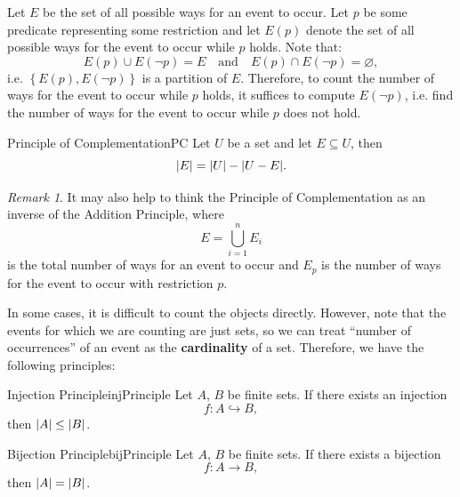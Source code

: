 \documentclass[math]{amznotes}
\theoremstyle{remark}
\newtheorem*{remark}{Remark}
\newcommand{\0}{\mathbf{0}}
\newcommand{\1}{\mathbf{1}}
\begin{document}
Let $E$ be the set of all possible ways for an event to occur. Let $p$ be some predicate representing some restriction and let $E(p)$ denote the set of all possible ways for the event to occur while $p$ holds. Note that:
\begin{displaymath}
    E(p) \cup E(\neg p) = E \quad \textrm{and} \quad E(p) \cap E(\neg p) = \varnothing,
\end{displaymath}
i.e. $\left\{E(p), E(\neg p)\right\}$ is a partition of $E$. Therefore, to count the number of ways for the event to occur while $p$ holds, it suffices to compute $E(\neg p)$, i.e. find the number of ways for the event to occur while $p$ does not hold.
\begin{thmbox}{Principle of Complementation}{PC}
    Let $U$ be a set and let $E \subseteq U$, then 
    \begin{equation*}
        {\left\lvert {E} \right\rvert} = {\left\lvert {U} \right\rvert} - {\left\lvert {U - E} \right\rvert}.
    \end{equation*}
\end{thmbox}
\begin{notebox}
    \begin{remark}
        It may also help to think the Principle of Complementation as an inverse of the Addition Principle, where
        \begin{displaymath}
            E = \bigcup_{i = 1}^n E_i
        \end{displaymath}
        is the total number of ways for an event to occur and $E_p$ is the number of ways for the event to occur with restriction $p$.
    \end{remark}
\end{notebox}
In some cases, it is difficult to count the objects directly. However, note that the events for which we are counting are just sets, so we can treat ``number of occurrences'' of an event as the \textbf{cardinality} of a set. Therefore, we have the following principles:
\begin{thmbox}{Injection Principle}{injPrinciple}
    Let $A$, $B$ be finite sets. If there exists an injection
    \begin{displaymath}
        f \colon A \hookrightarrow B,
    \end{displaymath}
    then ${\left\lvert {A} \right\rvert} \leq {\left\lvert {B} \right\rvert}$.
\end{thmbox}
\begin{thmbox}{Bijection Principle}{bijPrinciple}
    Let $A$, $B$ be finite sets. If there exists a bijection
    \begin{displaymath}
        f \colon A \to B,
    \end{displaymath}
    then ${\left\lvert {A} \right\rvert} = {\left\lvert {B} \right\rvert}$.
\end{thmbox}
\end{document}
